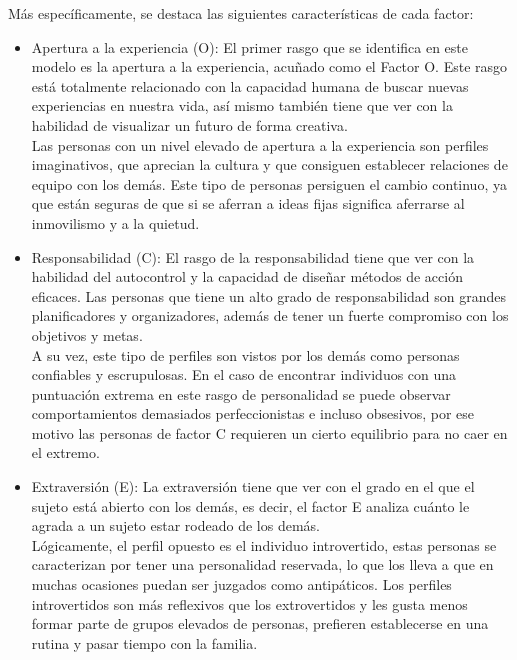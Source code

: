 \documentclass{report}
\begin{document}
Más específicamente, se destaca las siguientes características de cada factor:\\
\begin{itemize}
\item Apertura a la experiencia (O): El primer rasgo que se identifica en este modelo es la apertura a la experiencia, acuñado como el Factor O. Este rasgo está totalmente relacionado con la capacidad humana de buscar nuevas experiencias en nuestra vida, así mismo también tiene que ver con la habilidad de visualizar un futuro de forma creativa.\\

Las personas con un nivel elevado de apertura a la experiencia son perfiles imaginativos, que aprecian la cultura y que consiguen establecer relaciones de equipo con los demás. Este tipo de personas persiguen el cambio continuo, ya que están seguras de que si se aferran a ideas fijas significa aferrarse al inmovilismo y a la quietud.\\

\item Responsabilidad (C): El rasgo de la responsabilidad tiene que ver con la habilidad del autocontrol y la capacidad de diseñar métodos de acción eficaces. Las personas que tiene un alto grado de responsabilidad son grandes planificadores y organizadores, además de tener un fuerte compromiso con los objetivos y metas.\\

A su vez, este tipo de perfiles son vistos por los demás como personas confiables y escrupulosas. En el caso de encontrar individuos con una puntuación extrema en este rasgo de personalidad se puede observar comportamientos demasiados perfeccionistas e incluso obsesivos, por ese motivo las personas de factor C requieren un cierto equilibrio para no caer en el extremo.\\

\item Extraversión (E): La extraversión tiene que ver con el grado en el que el sujeto está abierto con los demás, es decir, el factor E analiza cuánto le agrada a un sujeto estar rodeado de los demás.\\

Lógicamente, el perfil opuesto es el individuo introvertido, estas personas se caracterizan por tener una personalidad reservada, lo que los lleva a que en muchas ocasiones puedan ser juzgados como antipáticos. Los perfiles introvertidos son más reflexivos que los extrovertidos y les gusta menos formar parte de grupos elevados de personas, prefieren establecerse en una rutina y pasar tiempo con la familia.\\


\end{itemize}
\end{document}
